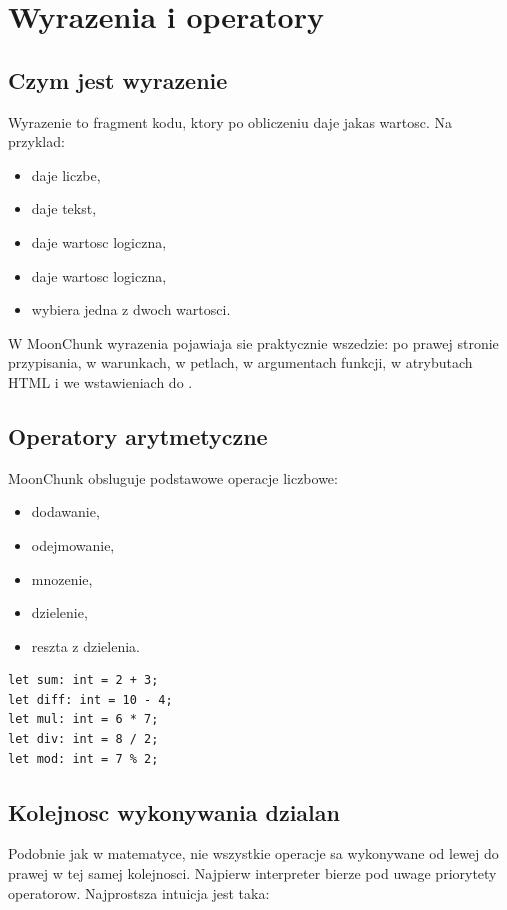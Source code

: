 \chapter{Wyrazenia i operatory}

\section{Czym jest wyrazenie}
Wyrazenie to fragment kodu, ktory po obliczeniu daje jakas wartosc. Na przyklad:

\begin{itemize}
  \item {} daje liczbe,
  \item {} daje tekst,
  \item {} daje wartosc logiczna,
  \item {} daje wartosc logiczna,
  \item {} wybiera jedna z dwoch wartosci.
\end{itemize}

W MoonChunk wyrazenia pojawiaja sie praktycznie wszedzie: po prawej stronie przypisania,
w warunkach, w petlach, w argumentach funkcji, w atrybutach HTML i we wstawieniach do
.

\section{Operatory arytmetyczne}
MoonChunk obsluguje podstawowe operacje liczbowe:

\begin{itemize}
  \item \mc{+} dodawanie,
  \item \mc{-} odejmowanie,
  \item \mc{*} mnozenie,
  \item \mc{/} dzielenie,
  \item \mc{\%} reszta z dzielenia.
\end{itemize}

\begin{lstlisting}[style=moonchunk,caption={Podstawowe obliczenia}]
let sum: int = 2 + 3;
let diff: int = 10 - 4;
let mul: int = 6 * 7;
let div: int = 8 / 2;
let mod: int = 7 % 2;
\end{lstlisting}

\section{Kolejnosc wykonywania dzialan}
Podobnie jak w matematyce, nie wszystkie operacje sa wykonywane od lewej do prawej w
tej samej kolejnosci. Najpierw interpreter bierze pod uwage priorytety operatorow.
Najprostsza intuicja jest taka:

